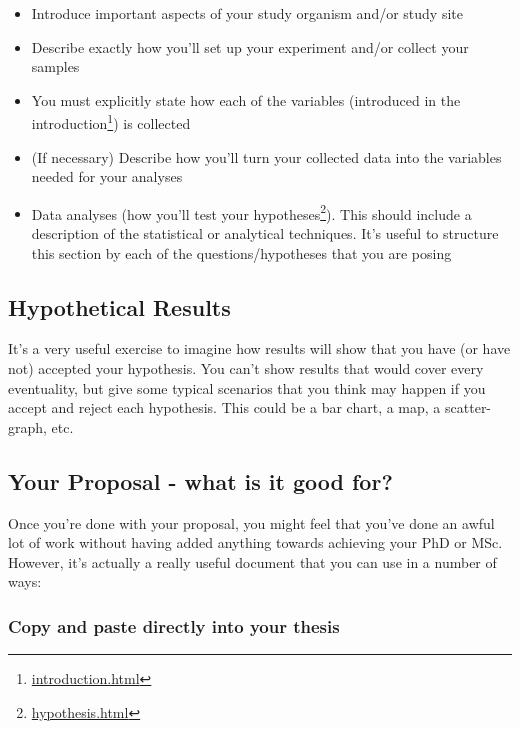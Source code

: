 \documentclass[
]{krantz}
\providecommand{\tightlist}{%
  \setlength{\itemsep}{0pt}\setlength{\parskip}{0pt}}
\renewcommand{\href}[2]{#2\footnote{\url{#1}}}
\begin{document}
\begin{itemize}
\tightlist
\item
  Introduce important aspects of your study organism and/or study site
\item
  Describe exactly how you'll set up your experiment and/or collect your samples
\item
  You must explicitly state how each of the variables (introduced in the \href{introduction.html}{introduction}) is collected
\item
  (If necessary) Describe how you'll turn your collected data into the variables needed for your analyses
\item
  Data analyses (how you'll test your \href{hypothesis.html}{hypotheses}). This should include a description of the statistical or analytical techniques. It's useful to structure this section by each of the questions/hypotheses that you are posing
\end{itemize}

\hypertarget{hypothetical-results}{%
\subsection{Hypothetical Results}\label{hypothetical-results}}

It's a very useful exercise to imagine how results will show that you have (or have not) accepted your hypothesis. You can't show results that would cover every eventuality, but give some typical scenarios that you think may happen if you accept and reject each hypothesis. This could be a bar chart, a map, a scatter-graph, etc.

\hypertarget{your-proposal---what-is-it-good-for}{%
\subsection{Your Proposal - what is it good for?}\label{your-proposal---what-is-it-good-for}}

Once you're done with your proposal, you might feel that you've done an awful lot of work without having added anything towards achieving your PhD or MSc. However, it's actually a really useful document that you can use in a number of ways:

\hypertarget{copy-and-paste-directly-into-your-thesis}{%
\subsubsection{Copy and paste directly into your thesis}\label{copy-and-paste-directly-into-your-thesis}}
\end{document}
